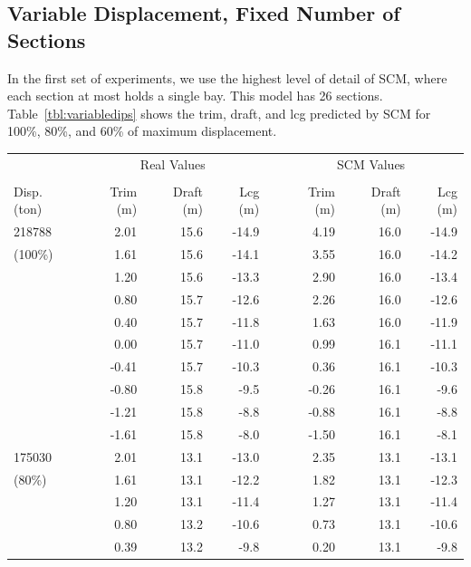 \documentclass[runningheads]{llncs}
\begin{document}
\subsection{Variable Displacement, Fixed Number of Sections}

In the first set of experiments, we use the highest level of detail of SCM, where each section at most holds a single bay. This model has 26 sections. Table~\ref{tbl:variabledips} shows the trim, draft, and lcg predicted by SCM for 
100\%, 80\%, and 60\% of maximum displacement.
\begin{table}[h!]
\begin{tabular}{l@{\:\:}rrrc@{\:\:}@{\:\:}rrr}              
&\multicolumn{3}{c}{Real Values} & & \multicolumn{3}{c}{SCM Values}\\[0.1ex] \cline{2-4} \cline{6-8} 
\\[-1ex]
Disp. (ton) &  Trim (m)  &   Draft (m)  &   Lcg (m) & &  Trim (m)  &  Draft (m) &   Lcg (m)\\
\hline \rule{0pt}{3ex}
218788      &2.01      &15.6    &-14.9  & &4.19    &16.0&-14.9  \\
(100\%)                &1.61    &15.6    &-14.1 &  &3.55    &16.0&-14.2  \\
                &1.20    &15.6    &-13.3 &  &2.90    &16.0&-13.4  \\
                &0.80    &15.7    &-12.6 &  &2.26    &16.0&-12.6  \\
                &0.40    &15.7    &-11.8 &  &1.63    &16.0&-11.9  \\
                &0.00    &15.7    &-11.0 &  &0.99    &16.1&-11.1  \\
                &-0.41   &15.7    &-10.3 &  &0.36    &16.1&-10.3  \\
                &-0.80   &15.8    &-9.5  &   &-0.26   &16.1&-9.6   \\
                &-1.21   &15.8    &-8.8  &   &-0.88   &16.1&-8.8   \\
                &-1.61   &15.8    &-8.0  &   &-1.50   &16.1&-8.1   \\
\hline \rule{0pt}{3ex}
175030      &2.01      &13.1    &-13.0  & &2.35    &13.1&-13.1  \\
(80\%)  &1.61    &13.1    &-12.2  & &1.82    &13.1&-12.3  \\
                &1.20    &13.1    &-11.4 &  &1.27    &13.1&-11.4  \\
                &0.80    &13.2    &-10.6 &  &0.73    &13.1&-10.6  \\
                &0.39    &13.2    &-9.8  &   &0.20    &13.1&-9.8   \\

\end{tabular}
\end{table}
\end{document}
